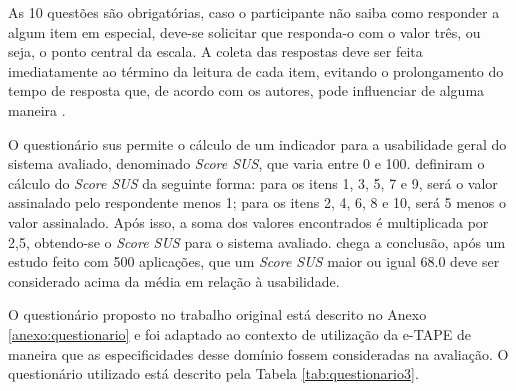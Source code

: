 \par
 As 10 questões são obrigatórias, caso o participante não saiba como responder a algum item em especial, deve-se solicitar que responda-o com o valor três, ou seja, o ponto central da escala. A coleta das respostas 
deve ser feita imediatamente ao término da leitura de cada item, evitando o prolongamento do tempo de resposta que, de acordo com os autores, pode influenciar de alguma maneira \cite{brooke1996sus}.

\par

O questionário \acrshort{sus} permite o cálculo de um indicador para a usabilidade geral do sistema avaliado, denominado \textit{Score SUS}, que varia entre 0 e 100. 
 definiram o cálculo do \textit{Score SUS} da seguinte forma:
para os itens 1, 3, 5, 7 e 9, será o valor assinalado pelo respondente menos 1; para os itens 2, 4, 6, 8 e 10, será 5 menos o valor assinalado. Após isso, a soma dos valores 
encontrados é multiplicada por 2,5, obtendo-se o \textit{Score SUS} para o sistema avaliado.  chega a conclusão, após um estudo feito com 500 aplicações, 
que um \textit{Score SUS} maior ou igual 68.0 deve ser considerado acima da média em relação à usabilidade.

\par
O questionário proposto no trabalho original está descrito no Anexo \ref{anexo:questionario} e foi adaptado ao contexto de utilização da e-TAPE de maneira que as especificidades desse domínio fossem consideradas na avaliação. 
O questionário utilizado está descrito pela Tabela \ref{tab:questionario3}.

